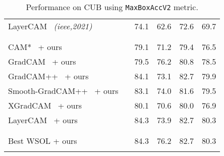 \documentclass[twocolumn]{article}
\newcommand\newmaxboxacc{\texttt{MaxBoxAccV2}\xspace}
\theoremstyle{definition}
\begin{document}
{\begin{table}[ht!]
{\begin{tabular}{lc*{3}{c}g}
LayerCAM~\cite{JiangZHCW21layercam} {\small \emph{(ieee,2021)}}  &  &          74.1 & 62.6 & 72.6 & 69.7 \\
\\
 \\
CAM*~\cite{zhou2016learning} + ours    &  &            79.1 & 71.2 & 79.4 & 76.5 \\
GradCAM~\cite{SelvarajuCDVPB17iccvgradcam} + ours  &  &           79.5 & 76.2 & 80.8 & 78.5 \\
GradCAM++~\cite{ChattopadhyaySH18wacvgradcampp} + ours &  &          84.1 & 73.1 & 82.7 & 79.9 \\
Smooth-GradCAM++~\cite{omeiza2019corr} + ours  &  &  83.1 & 74.0 & 81.6 & 79.5 \\
XGradCAM~\cite{fu2020axiom} + ours  &  &          80.1 & 70.6 & 80.0 & 76.9 \\
LayerCAM~\cite{JiangZHCW21layercam} + ours &  &           84.3 & 73.9 & 82.7 & 80.3 \\
\\
 \\
Best WSOL + ours    &&         84.3 & 76.2 & 82.7 & 80.3 \\
\\
\end{tabular}
}
\caption{Performance on CUB using \newmaxboxacc metric.}
\label{tab:maxboxv2}
\vspace{-1em}
\end{table}
}
\end{document}
